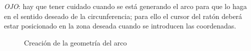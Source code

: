 \documentclass[spanish,a4paper,12pt]{article}
\begin{document}
\emph{OJO}: hay que tener cuidado cuando se está generando el arco para que lo haga en el sentido deseado de la circunferencia; para ello el cursor del ratón deberá estar posicionado en la zona deseada cuando se introducen las coordenadas.
\begin{figure}[h!tp]
\centering
{}
\caption{Creación de la geometría del arco}
\label{fig:arco}
\end{figure}
\end{document}
